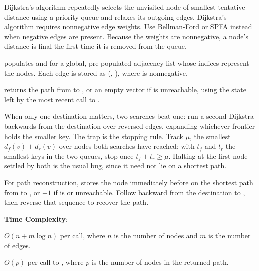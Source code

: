Dijkstra's algorithm repeatedly selects the unvisited node of smallest tentative distance using a priority queue and relaxes its outgoing edges. Dijkstra's algorithm requires nonnegative edge weights. Use Bellman-Ford or SPFA instead when negative edges are present. Because the weights are nonnegative, a node's distance is final the first time it is removed from the queue.

\begin{compactitem}
  \item {} populates  and  for a global, pre-populated adjacency list  whose indices represent the nodes. Each edge is stored as (, ), where  is nonnegative.
  \item {} returns the path from  to , or an empty vector if  is unreachable, using the state left by the most recent call to .
\end{compactitem}

When only one destination matters, two searches beat one: run a second Dijkstra backwards from the destination over reversed edges, expanding whichever frontier holds the smaller key. The trap is the stopping rule. Track $\mu$, the smallest $d_f(v) + d_r(v)$ over nodes both searches have reached; with $t_f$ and $t_r$ the smallest keys in the two queues, stop once $t_f + t_r \geq \mu$. Halting at the first node settled by both is the usual bug, since it need not lie on a shortest path.

For path reconstruction,  stores the node immediately before  on the shortest path from  to , or $-1$ if  is  or unreachable. Follow  backward from the destination to , then reverse that sequence to recover the path.

\textbf{Time Complexity}:
\begin{compactitem}
  \item $O(n + m \log n)$ per call, where $n$ is the number of nodes and $m$ is the number of edges.
  \item $O(p)$ per call to , where $p$ is the number of nodes in the returned path.
\end{compactitem}

